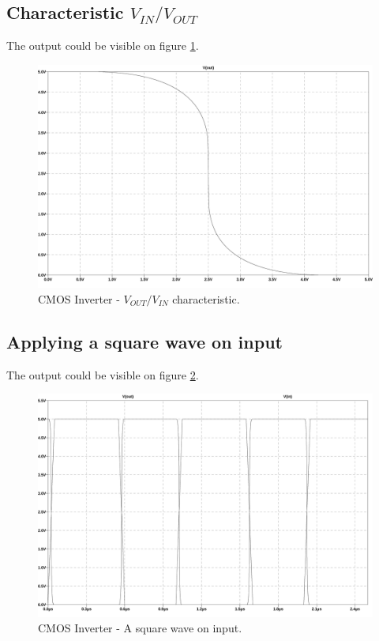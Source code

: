 \subsection{Characteristic $V_{IN}/V_{OUT}$}

The output could be visible on figure \ref{characteristic}.
\begin{figure}[H]
  \centering
  \includegraphics[width=14cm]{graph/CMOSInverter/Characteristic.jpg}
  \caption{CMOS Inverter - $V_{OUT}/V_{IN}$ characteristic.}
  \label{characteristic}
\end{figure}

\subsection{Applying a square wave on input}

The output could be visible on figure \ref{SquareWave}.
\begin{figure}[H]
  \centering
  \includegraphics[width=14cm]{graph/CMOSInverter/SquareWave.jpg}
  \caption{CMOS Inverter - A square wave on input.}
  \label{SquareWave}
\end{figure}


